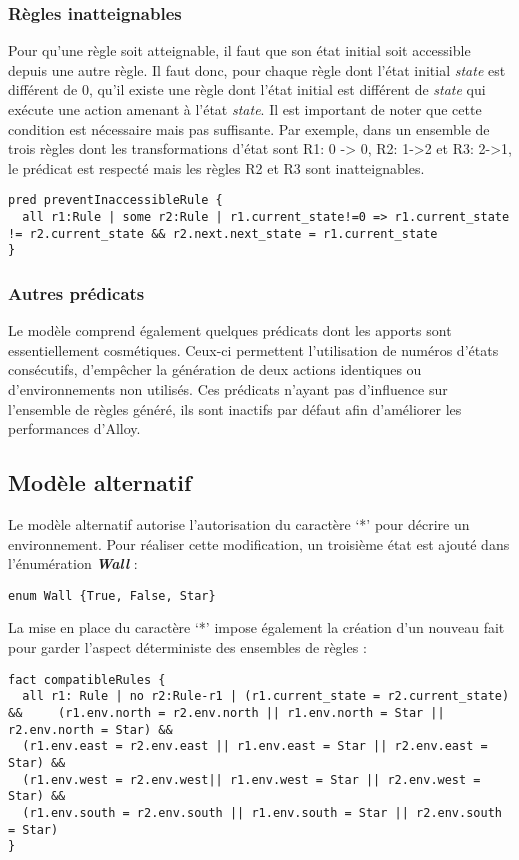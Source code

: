 \documentclass{article}
\begin{document}
\subsubsection*{Règles inatteignables}
Pour qu’une règle soit atteignable, il faut que son état initial soit accessible depuis une autre règle. Il faut donc, pour chaque règle dont l’état initial \textit{state} est différent de 0, qu’il existe une règle dont l’état initial est différent de \textit{state} qui exécute une action amenant à l’état \textit{state}. Il est important de noter que cette condition est nécessaire mais pas suffisante. Par exemple, dans un ensemble de trois règles dont les transformations d’état sont R1: 0 -> 0, R2: 1->2 et R3: 2->1, le prédicat est respecté mais les règles R2 et R3 sont inatteignables.

\begin{lstlisting}
pred preventInaccessibleRule {
  all r1:Rule | some r2:Rule | r1.current_state!=0 => r1.current_state != r2.current_state && r2.next.next_state = r1.current_state
}
\end{lstlisting}

\subsubsection{Autres prédicats}
Le modèle comprend également quelques prédicats dont les apports sont essentiellement cosmétiques. Ceux-ci permettent l'utilisation de numéros d’états consécutifs, d'empêcher la génération de deux actions identiques ou d’environnements non utilisés. Ces prédicats n'ayant pas d'influence sur l'ensemble de règles généré, ils sont inactifs par défaut afin d'améliorer les performances d'Alloy.

\subsection{Modèle alternatif}
Le modèle alternatif autorise l'autorisation du caractère ‘*’ pour décrire un environnement. Pour réaliser cette modification, un troisième état est ajouté dans l’énumération \textit{\textbf{Wall}} :

\begin{lstlisting}
enum Wall {True, False, Star}
\end{lstlisting}

La mise en place du caractère ‘*’ impose également la création d'un nouveau fait pour garder l'aspect déterministe des ensembles de règles :

\begin{lstlisting}
fact compatibleRules {
  all r1: Rule | no r2:Rule-r1 | (r1.current_state = r2.current_state) &&     (r1.env.north = r2.env.north || r1.env.north = Star || r2.env.north = Star) &&
  (r1.env.east = r2.env.east || r1.env.east = Star || r2.env.east = Star) &&
  (r1.env.west = r2.env.west|| r1.env.west = Star || r2.env.west = Star) &&
  (r1.env.south = r2.env.south || r1.env.south = Star || r2.env.south = Star) 
}
\end{lstlisting}
\end{document}
